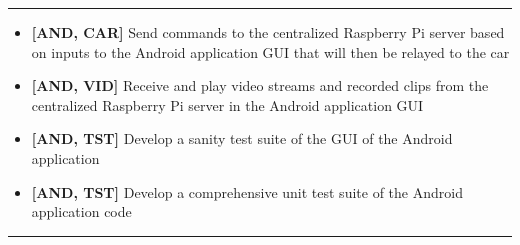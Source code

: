 \documentclass[letterpaper,12pt]{report}
\begin{document}
	\noindent\rule{\textwidth}{0.5pt}
	\begin{itemize}
		\item \textbf{[AND, CAR]} Send commands to the centralized Raspberry Pi
			server based on inputs to the Android application GUI that will then
			be relayed to the car
		\item \textbf{[AND, VID]} Receive and play video streams and recorded
			clips from the centralized Raspberry Pi server in the Android
			application GUI
		\item \textbf{[AND, TST]} Develop a sanity test suite of the GUI of the
			Android application
		\item \textbf{[AND, TST]} Develop a comprehensive unit test suite of the
			Android application code
	\end{itemize}
	\noindent\rule{\textwidth}{0.5pt}
\end{document}
